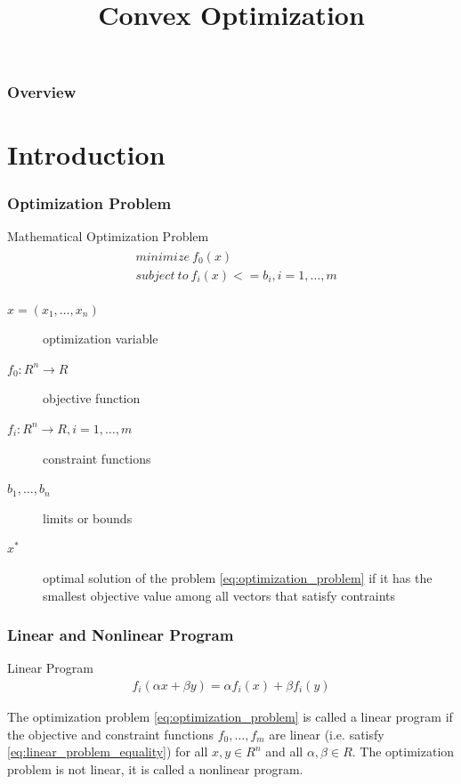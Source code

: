 \documentclass{beamer}
\title[Short title]{Convex Optimization} %
\begin{document}
\begin{frame}
\titlepage
\end{frame}

\begin{frame}
\frametitle{Overview}
\tableofcontents
\end{frame}


\section{Introduction}


\begin{frame}
\frametitle{Optimization Problem}
\begin{block}{Mathematical Optimization Problem}
\begin{align}
\begin{split}
\label{eq:optimization_problem}
&minimize~f_{0}(x) \\
&subject~to~f_{i}(x) <= b_{i}, i = 1,\dots,m
\end{split}
\end{align}
\end{block}
\begin{description}
\item [$x = (x_{1},\dots,x_{n})$] optimization variable
\item [$f_{0} : R^{n} \rightarrow R$] objective function\item [$f_{i} : R^{n} \rightarrow R, i=1,\dots,m$] constraint functions
\item [$b_{1},\dots,b_{n}$] limits or bounds
\item [$x^{*}$] optimal solution of the problem \ref{eq:optimization_problem} if it has the smallest objective value among all vectors that satisfy contraints
\end{description}
\end{frame}


\begin{frame}
\frametitle{Linear and Nonlinear Program}
\begin{block}{Linear Program}
\begin{align}
\label{eq:linear_problem_equality}
f_{i}(\alpha x + \beta y) = \alpha f_{i}(x) + \beta f_{i}(y)
\end{align}
\end{block}
The optimization problem \ref{eq:optimization_problem} is called a linear program if the objective and constraint functions $f_{0},\dots,f_{m}$ are linear (i.e. satisfy \ref{eq:linear_problem_equality}) for all $x, y \in R^{n}$ and all $\alpha, \beta \in R$.
The optimization problem is not linear, it is called a nonlinear program.
\end{frame}
\end{document}
